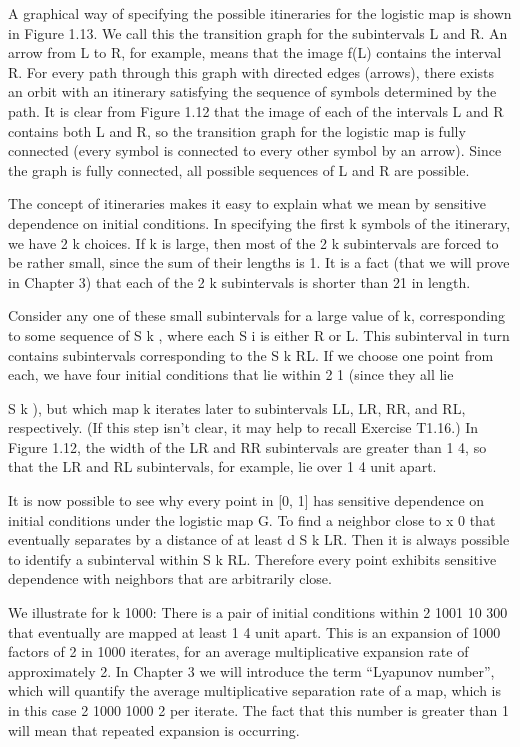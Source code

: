 \documentclass[12pt]{article}
\begin{document}
A graphical way of specifying the possible itineraries for the logistic map is shown in Figure 1.13. We 
call this the transition graph for the subintervals L and R. An arrow from L to R, for example, means that 
the image f(L) contains the interval R. For every path through this graph with directed edges (arrows), 
there exists an orbit with an itinerary satisfying the sequence of symbols determined by the path. It is 
clear from Figure 1.12 that the image of each of the intervals L and R contains both L and R, so the 
transition graph for the logistic map is fully connected (every symbol is connected to every other symbol 
by an arrow). Since the graph is fully connected, all possible sequences of L and R are possible.

The concept of itineraries makes it easy to explain what we mean by sensitive dependence on initial 
conditions. In specifying the first k symbols of the itinerary, we have 2 k choices. If k is large, then 
most of the 2 k subintervals are forced to be rather small, since the sum of their lengths is 1. It is a 
fact (that we will prove in Chapter 3) that each of the 2 k subintervals is shorter than    21  in length.

Consider any one of these small subintervals for a large value of k, corresponding to some sequence of 
 S k , where each S i is either R or L. This subinterval in turn contains subintervals corresponding to the 
 S k RL. If we choose one point from each, we have four initial conditions that lie within 
  2 1 (since they all lie

 S k ), but which map k iterates later to subintervals LL, LR, RR, and RL, respectively. (If this step 
isn’t clear, it may help to recall Exercise T1.16.) In Figure 1.12, the width of the LR and RR subintervals 
are greater than 1  4, so that the LR and RL subintervals, for example, lie over 1  4 unit apart.

It is now possible to see why every point in [0, 1] has sensitive dependence on initial conditions under 
the logistic map G. To find a neighbor close to x 0 that eventually separates by a distance of at least d  
 S k LR. Then it is always possible to identify a subinterval within 
 S k RL. Therefore every point exhibits sensitive dependence with neighbors that are arbitrarily close.

We illustrate for k  1000: There is a pair of initial conditions within 2 1001  10 300 that eventually are 
mapped at least 1  4 unit apart. This is an expansion of 1000 factors of 2 in 1000 iterates, for an average 
multiplicative expansion rate of approximately 2. In Chapter 3 we will introduce the term “Lyapunov 
number”, which will quantify the average multiplicative separation rate of a map, which is in this case 2 
1000  1000  2 per iterate. The fact that this number is greater than 1 will mean that repeated expansion is 
occurring.
\end{document}

